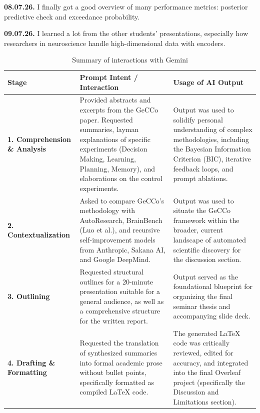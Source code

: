 \textbf{08.07.26.} I finally got a good overview of many performance metrics: posterior predictive check and exceedance probability.
 
\textbf{09.07.26.} I learned a lot from the other students' presentations, especially how researchers in neuroscience handle high-dimensional data with encoders.
 
\begin{table}[h]
    \centering
    \renewcommand{\arraystretch}{1.5}
    \begin{tabularx}{\textwidth}{@{} >{\raggedright\arraybackslash}p{3cm} X X @{}}
        \toprule
        \textbf{Stage} & \textbf{Prompt Intent / Interaction} & \textbf{Usage of AI Output} \\
        \midrule
        \textbf{1. Comprehension \& Analysis} & Provided abstracts and excerpts from the GeCCo paper. Requested summaries, layman explanations of specific experiments (Decision Making, Learning, Planning, Memory), and elaborations on the control experiments. & Output was used to solidify personal understanding of complex methodologies, including the Bayesian Information Criterion (BIC), iterative feedback loops, and prompt ablations. \\
        \textbf{2. Contextualization} & Asked to compare GeCCo's methodology with AutoResearch, BrainBench (Luo et al.), and recursive self-improvement models from Anthropic, Sakana AI, and Google DeepMind. & Output was used to situate the GeCCo framework within the broader, current landscape of automated scientific discovery for the discussion section. \\
        \textbf{3. Outlining} & Requested structural outlines for a 20-minute presentation suitable for a general audience, as well as a comprehensive structure for the written report. & Output served as the foundational blueprint for organizing the final seminar thesis and accompanying slide deck. \\
        \textbf{4. Drafting \& Formatting} & Requested the translation of synthesized summaries into formal academic prose without bullet points, specifically formatted as compiled \LaTeX{} code. & The generated \LaTeX{} code was critically reviewed, edited for accuracy, and integrated into the final Overleaf project (specifically the Discussion and Limitations section). \\
        \bottomrule
    \end{tabularx}
    \caption{Summary of interactions with Gemini}
\end{table} 

 



